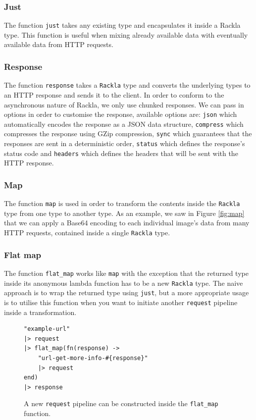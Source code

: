 \documentclass{cslthse-msc}
\begin{document}
\subsubsection{Just}
The function \lstinline{just} takes any existing type and encapsulates it inside a Rackla type. This function is useful when mixing already available data with eventually available data from HTTP requests.

\subsubsection{Response}
The function \lstinline{response} takes a \lstinline{Rackla} type and converts the underlying types to an HTTP response and sends it to the client. In order to conform to the asynchronous nature of Rackla, we only use chunked responses\cite{chunked}. We can pass in options in order to customise the response, available options are: \lstinline{json} which automatically encodes the response as a JSON data structure, \lstinline{compress} which compresses the response using GZip compression, \lstinline{sync} which guarantees that the responses are sent in a deterministic order, \lstinline{status} which defines the response's status code and \lstinline{headers} which defines the headers that will be sent with the HTTP response.

\subsubsection{Map}
The function \lstinline{map} is used in order to transform the contents inside the \lstinline{Rackla} type from one type to another type. As an example, we saw in Figure \ref{fig:map} that we can apply a Base64 encoding to each individual image's data from many HTTP requests, contained inside a single \lstinline{Rackla} type.

\subsubsection{Flat map}
The function \lstinline{flat_map} works like \lstinline{map} with the exception that the returned type inside its anonymous lambda function has to be a new \lstinline{Rackla} type. The naive approach is to wrap the returned type using \lstinline{just}, but a more appropriate usage is to utilise this function when you want to initiate another \lstinline{request} pipeline inside a transformation.

\begin{figure}[H]
  \centering
\begin{lstlisting}[breaklines=true,frame=single]
"example-url"
|> request
|> flat_map(fn(response) -> 
	"url-get-more-info-#{response}" 
	|> request 
end)
|> response
\end{lstlisting}
  \caption{A new \lstinline{request} pipeline can be constructed inside the \lstinline{flat_map} function.}
\end{figure}
\end{document}
